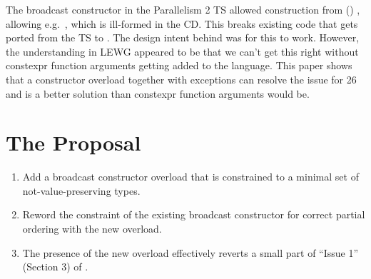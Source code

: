 \newcommand\wgTitle{value-preserving consteval broadcast to \code{simd::vec}}
\newcommand\wgName{Matthias Kretz <m.kretz@gsi.de>}
\newcommand\wgDocumentNumber{P4012R1}
\newcommand\wgGroup{LWG}
\newcommand\wgTarget{\CC{}26}

\usepackage{mymacros}
\usepackage{wg21}
\setcounter{tocdepth}{2} %
\hypersetup{bookmarksdepth=5}
\usepackage{changelog}
\usepackage{underscore}
\usepackage{multirow}
\usepackage{vectorpictures}



\newcommand\wglink[1]{\href{https://wg21.link/#1}{#1}}

\renewcommand{\lst}[1]{Listing~\ref{#1}}
\renewcommand{\sect}[1]{Section~\ref{#1}}
\renewcommand{\ttref}[1]{Tony~Table~\ref{#1}}
\renewcommand{\tabref}[1]{Table~\ref{#1}}


\begin{wgTitlepage}
  The broadcast constructor in the Parallelism 2 TS allowed construction from ()
  , allowing e.g.\ , which is ill-formed in the CD\@.
  This breaks existing code that gets ported from the TS to .
  The design intent behind  was for this to work.
  However, the understanding in LEWG appeared to be that we can't get this right without constexpr
  function arguments getting added to the language.
  This paper shows that a  constructor overload together with 
  exceptions can resolve the issue for \CC{}26 and is a better solution than constexpr function
  arguments would be.
\end{wgTitlepage}

\pagestyle{scrheadings}




\section{The Proposal}
\begin{enumerate}
  \item Add a  broadcast constructor overload that is constrained to a minimal set
    of not-value-preserving types.
  \item Reword the constraint of the existing broadcast constructor for correct partial ordering
    with the new  overload.
  \item The presence of the new overload effectively reverts a small part of “Issue 1” (Section 3)
    of \parencite{P3430R3}.
\end{enumerate}

